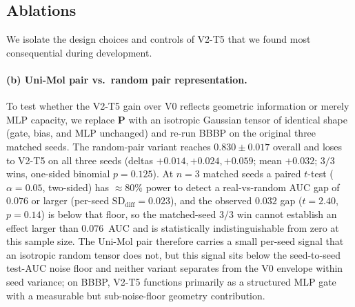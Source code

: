 \documentclass[sigconf,nonacm,anonymous,review]{acmart}
\begin{document}
\subsection{Ablations}
\label{sec:ablations}
We isolate the design choices and controls of V2-T5 that we found most consequential during development.

\paragraph{(b) Uni-Mol pair vs.\ random pair representation.}
To test whether the V2-T5 gain over V0 reflects geometric information or merely MLP capacity, we replace $\mathbf{P}$ with an isotropic Gaussian tensor of identical shape (gate, bias, and MLP unchanged) and re-run BBBP on the original three matched seeds. The random-pair variant reaches $0.830 \pm 0.017$ overall and loses to V2-T5 on all three seeds (deltas $+0.014, +0.024, +0.059$; mean $+0.032$; $3/3$ wins, one-sided binomial $p{=}0.125$). At $n{=}3$ matched seeds a paired $t$-test ($\alpha{=}0.05$, two-sided) has $\approx$80\% power to detect a real-vs-random AUC gap of $0.076$ or larger (per-seed $\mathrm{SD}_{\mathrm{diff}}{=}0.023$), and the observed $0.032$ gap ($t{=}2.40$, $p{=}0.14$) is below that floor, so the matched-seed $3/3$ win cannot establish an effect larger than $0.076$~AUC and is statistically indistinguishable from zero at this sample size. The Uni-Mol pair therefore carries a small per-seed signal that an isotropic random tensor does not, but this signal sits below the seed-to-seed test-AUC noise floor and neither variant separates from the V0 envelope within seed variance; on BBBP, V2-T5 functions primarily as a structured MLP gate with a measurable but sub-noise-floor geometry contribution.
\end{document}
